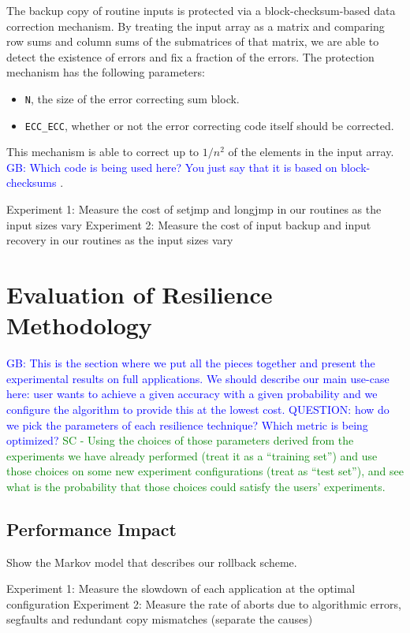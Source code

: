 \documentclass[prodmode,acmtecs]{acmconf} %
\newcommand{\sui}[1]{%
  \textcolor{green}{SC - #1}
}
\newcommand{\greg}[1]{%
  \textcolor{blue}{GB: #1}
}
\begin{document}
The backup copy of routine inputs is protected via a block-checksum-based data correction mechanism.
By treating the input array as a matrix and comparing row sums and column sums of the submatrices of that matrix, we are able to detect the existence of errors and fix a fraction of the errors.
The protection mechanism has the following parameters:
\begin{itemize}
\item{\texttt{N}, the size of the error correcting sum block.}
\item{\texttt{ECC\_ECC}, whether or not the error correcting code itself should be corrected.}
\end{itemize}
This mechanism is able to correct up to $1/{n^2}$ of the elements in the input array.
\greg{Which code is being used here? You just say that it is based on block-checksums}.

Experiment 1: Measure the cost of setjmp and longjmp in our routines as the input sizes vary
Experiment 2: Measure the cost of input backup and input recovery in our routines as the input sizes vary

\section{Evaluation of Resilience Methodology}
\label{sec:eval}

\greg{This is the section where we put all the pieces together and present the experimental results on full applications. We should describe our main use-case here: user wants to achieve a given accuracy with a given probability and we configure the algorithm to provide this at the lowest cost. QUESTION: how do we pick the parameters of each resilience technique? Which metric is being optimized?} \sui{Using the choices of those parameters derived from the experiments we have already performed (treat it as a ``training set'') and use those choices on some new experiment configurations (treat as ``test set''), and see what is the probability that those choices could satisfy the users' experiments.}

\subsection{Performance Impact}
\label{sec:eval:perf}

Show the Markov model that describes our rollback scheme.

Experiment 1: Measure the slowdown of each application at the optimal configuration
Experiment 2: Measure the rate of aborts due to algorithmic errors, segfaults and redundant copy mismatches (separate the causes)
\end{document}
